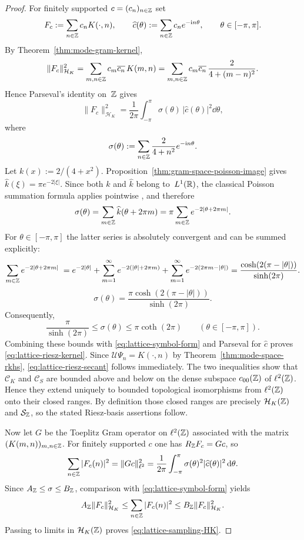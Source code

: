 \begin{proof}
For finitely supported $c=(c_n)_{n\in\mathbb{Z}}$ set
\[
F_c:=\sum_{n\in\mathbb{Z}}c_nK(\cdot,n),
\qquad
\widehat c(\theta):=\sum_{n\in\mathbb{Z}}c_ne^{-\mathrm{i} n\theta},
\qquad
\theta\in[-\pi,\pi].
\]
By Theorem~\ref{thm:mode-gram-kernel},
\[
\|F_c\|_{\mathcal H_K}^2
=\sum_{m,n\in\mathbb{Z}}c_m\overline{c_n}\,K(m,n)
=\sum_{m,n\in\mathbb{Z}}c_m\overline{c_n}\,\frac{2}{4+(m-n)^2}.
\]
Hence Parseval's identity on~$\mathbb{Z}$ gives
\begin{equation}\label{eq:lattice-symbol-form}
\|F_c\|_{\mathcal H_K}^2
=\frac{1}{2\pi}\int_{-\pi}^{\pi}\sigma(\theta)\,
|\widehat c(\theta)|^2\dd\theta,
\end{equation}
where
\[
\sigma(\theta):=\sum_{n\in\mathbb{Z}}\frac{2}{4+n^2}e^{-\mathrm{i} n\theta}.
\]
Let $k(x):=2/(4+x^2)$.  Proposition~\ref{thm:gram-space-poisson-image}
gives $\widehat k(\xi)=\pi e^{-2|\xi|}$.  Since both $k$ and $\widehat k$
belong to~$L^1(\mathbb{R})$, the classical Poisson summation formula applies
pointwise \cite[Chapter~III]{Stein1971}, and therefore
\[
\sigma(\theta)=\sum_{m\in\mathbb{Z}}\widehat k(\theta+2\pi m)
=\pi\sum_{m\in\mathbb{Z}}e^{-2|\theta+2\pi m|}.
\]
For $\theta\in[-\pi,\pi]$ the latter series is absolutely convergent and
can be summed explicitly:
\[
\sum_{m\in\mathbb{Z}}e^{-2|\theta+2\pi m|}
\;=e^{-2|\theta|}
+\sum_{m=1}^{\infty}e^{-2(|\theta|+2\pi m)}
+\sum_{m=1}^{\infty}e^{-2(2\pi m-|\theta|)}
=\frac{\cosh(2(\pi-|\theta|))}{\sinh(2\pi)}.
\]
\begin{equation}\label{eq:lattice-symbol}
\sigma(\theta)
=\frac{\pi\cosh(2(\pi-|\theta|))}{\sinh(2\pi)}.
\end{equation}
Consequently,
\[
\frac{\pi}{\sinh(2\pi)}
\le
\sigma(\theta)
\le
\pi\coth(2\pi)
\qquad(\theta\in[-\pi,\pi]).
\]
Combining these bounds with \eqref{eq:lattice-symbol-form} and Parseval
for $\widehat c$ proves \eqref{eq:lattice-riesz-kernel}.  Since
$\mathcal U\Psi_n=K(\cdot,n)$ by
Theorem~\ref{thm:mode-space-rkhs}, \eqref{eq:lattice-riesz-secant}
follows immediately.
The two inequalities show that $\mathcal C_K$ and $\mathcal C_S$
are bounded above and below on the dense subspace $c_{00}(\mathbb{Z})$ of
$\ell^2(\mathbb{Z})$.  Hence they extend uniquely to bounded topological
isomorphisms from $\ell^2(\mathbb{Z})$ onto their closed ranges.  By definition
those closed ranges are precisely $\mathcal H_K(\mathbb{Z})$ and
$\mathcal S_{\mathbb{Z}}$, so the stated Riesz-basis assertions follow.

Now let $G$ be the Toeplitz Gram operator on $\ell^2(\mathbb{Z})$ associated
with the matrix $(K(m,n))_{m,n\in\mathbb{Z}}$.  For finitely supported $c$ one
has $R_{\mathbb{Z}}F_c=Gc$, so
\[
\sum_{n\in\mathbb{Z}}|F_c(n)|^2
=\|Gc\|_{\ell^2}^2
=\frac{1}{2\pi}\int_{-\pi}^{\pi}\sigma(\theta)^2
|\widehat c(\theta)|^2\,\mathrm{d}\theta.
\]
Since $A_{\mathbb{Z}}\le \sigma\le B_{\mathbb{Z}}$, comparison with
\eqref{eq:lattice-symbol-form} yields
\[
A_{\mathbb{Z}}\|F_c\|_{\mathcal H_K}^2
\le
\sum_{n\in\mathbb{Z}}|F_c(n)|^2
\le
B_{\mathbb{Z}}\|F_c\|_{\mathcal H_K}^2.
\]
Passing to limits in $\mathcal H_K(\mathbb{Z})$ proves
\eqref{eq:lattice-sampling-HK}.


\end{proof}
